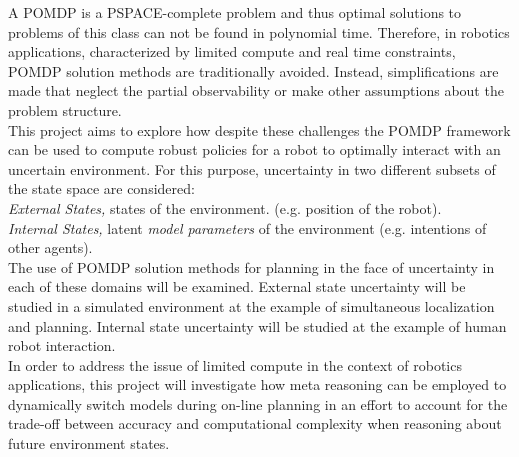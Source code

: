 A POMDP is a PSPACE-complete problem and thus optimal solutions to problems of
this class can not be found in polynomial time. Therefore, in robotics
applications, characterized by limited compute and real time constraints, POMDP
solution methods are traditionally avoided. Instead, simplifications are made
that neglect the partial observability or make other assumptions about the
problem structure.\\

This project aims to explore how despite these challenges the POMDP
framework can be used to compute robust policies for a robot to optimally
interact with an uncertain environment. For this purpose, uncertainty in
two different subsets of the state space are considered:\\
\textit{External States,}  states of the environment. (e.g. position of the
robot).\\
\textit{Internal States,} latent \textit{model parameters} of the
environment (e.g. intentions of other agents).\\

The use of POMDP solution methods for planning in the face of uncertainty in
each of these domains will be examined. External state uncertainty will be
studied in a simulated environment at the example of simultaneous localization
and planning. Internal state uncertainty will be studied at the example of
human robot interaction.\\
In order to address the issue of limited compute in the context of robotics
applications, this project will investigate how meta reasoning can be employed to
dynamically switch models during on-line planning in an effort to account for
the trade-off between accuracy and computational complexity when reasoning about
future environment states.
